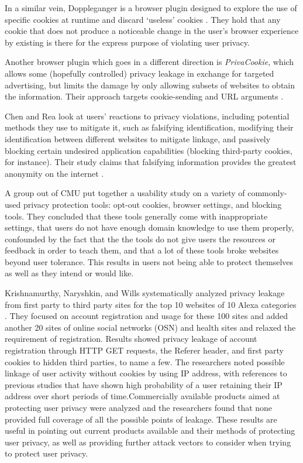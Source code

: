 \documentclass[11pt,twocolumn]{article}
\begin{document}
In a similar vein, Doppleganger is a browser plugin designed to explore the use of specific cookies at runtime and discard `useless' cookies \cite{Jackson:2006:PBS:1135777.1135884}.  They hold that any cookie that does not produce a noticeable change in the user's browser experience by existing is there for the express purpose of violating user privacy.

Another browser plugin which goes in a different direction is \textit{PrivaCookie}, which allows some (hopefully controlled) privacy leakage in exchange for targeted advertising, but limits the damage by only allowing subsets of websites to obtain the information.  Their approach targets cookie-sending and URL arguments \cite{freudiger2009towards}.

Chen and Rea look at users' reactions to privacy violations, including potential methods they use to mitigate it, such as falsifying identification, modifying their identification between different websites to mitigate linkage, and passively blocking certain undesired application capabilities (blocking third-party cookies, for instance).  Their study claims that falsifying information provides the greatest anonymity on the internet \cite{chen2004protecting}.
	
A group out of CMU put together a usability study on a variety of commonly-used privacy protection tools: opt-out cookies, browser settings, and blocking tools.  They concluded that these tools generally come with inappropriate settings, that users do not have enough domain knowledge to use them properly, confounded by the fact that the the tools do not give users the resources or feedback in order to teach them, and that a lot of these tools broke websites beyond user tolerance.  This results in users not being able to protect themselves as well as they intend or would like.
	
Krishnamurthy, Naryshkin, and Wills systematically analyzed privacy leakage from first party to third party sites for the top 10 websites of 10 Alexa categories \cite{Krishnamurthy2011Privacy}. They focused on account registration and usage for these 100 sites and added another 20 sites of online social networks (OSN) and health sites and relaxed the requirement of registration. Results showed  privacy leakage of account registration through HTTP GET requests, the Referer header, and first party cookies to hidden third parties, to name a few. The researchers noted possible linkage of user activity without cookies by using IP address, with references to previous studies that have shown high probability of a user retaining their IP address over short periods of time.Commercially available products aimed at protecting user privacy were analyzed and the researchers found that none provided full coverage of all the possible points of leakage. These results are useful in pointing out current products available and their methods of protecting user privacy, as well as providing further attack vectors to consider when trying to protect user privacy.
	
\end{document}
